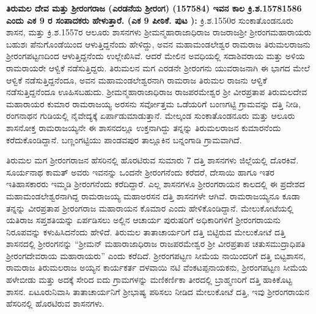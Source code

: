 \textbf{ತಿರುಮಲ ದೇವ ಮತ್ತು ಶ‍್ರೀರಂಗರಾಜ (ಎರಡನೆಯ ಶ‍್ರೀರಂಗ) (1575\general{\enginline{-}}84) ಇವನ ಕಾಲ ಕ್ರಿ.ಶ.1578\general{\enginline{-}}1586 ಎಂದು ಎಕ 9 ರ ಸಂಪಾದಕರು ಹೇಳುತ್ತಾರೆ. (ಎಕ 9 ಪೀಠಿಕೆ. ಪುಟ ): } ಕ್ರಿ.ಶ.1550ರ ಸುಂಕಾತೊಂಡನೂರು ಶಾಸನ, ಮತ್ತು ಕ್ರಿ.ಶ.1557ರ ಆಲೂರು ಶಾಸನಗಳು ಶ‍್ರೀಮನ್ಮಹಾರಾಜಾಧಿರಾಜ ರಾಜರಾಜಶ‍್ರೀ ಶ‍್ರೀರಂಗಮಹಾರಾಯರು ಬಹುಶಃ ಪೆನುಗೊಂಡೆಯಿಂದ ಆಳುತ್ತಿದ್ದನೆಂದು ಹೇಳಿದ್ದು, ಅವನ ಮಹಾಮಂಡಲೇಶ್ವರ ರಾಮರಾಜ ತಿರುಮಲರಾಜನು ಶ‍್ರೀರಂಗಪಟ್ಟಣದಿಂದ ಆಳುತ್ತಿದ್ದನೆಂದು ಉಲ್ಲೇಖಿಸಿವೆ. ಆದರೆ ಮೇಲಿನ ಅವಧಿಯಲ್ಲಿ ಸದಾಶಿವರಾಯ ಮತ್ತು ಅಳಿಯ ರಾಮರಾಯರೇ ಆಳ್ವಿಕೆ ನಡೆಸುತ್ತಿದ್ದರು. ತಿರುಮಲನ ಮಗ ಎರಡನೇ ಶ‍್ರೀರಂಗನು ಯುವರಾಜನಾಗಿ ಈ ಭಾಗದ ಮೇಲೆ ಆಳ್ವಿಕೆ ನಡೆಸುತ್ತಿದ್ದನೆಂದೂ, ಅವನ ಮಹಾಮಂಡಲೇಶ್ವರನಾಗಿ ರಾಮರಾಜ ತಿರುಮಲ ರಾಜನು ಆಳ್ವಿಕೆ ನಡೆಸುತ್ತಿದ್ದನೆಂದೂ ಊಹಿಸಬಹುದು. ಶ‍್ರೀಮನ್ಮಹಾರಾಜಾಧಿರಾಜ ರಾಜಪರಮೇಶ್ವರ ಶ‍್ರೀ ವೀರಪ್ರತಾಪ ತಿರುಮಲದೇವ ಮಹಾರಾಯರ ಕುಮಾರ ರಾಮರಾಜಯ್ಯ ಅರಸನು ಸರ್ವೋತ್ತಮ ಒಡೆಯರಿಗೆ ಬಂಣಗಟ್ಟಿ ಗ್ರಾಮವನ್ನು ದತ್ತಿ ನೀಡಿ, ರಂಗನಾಥನ ಗುಡಿಯಲ್ಲಿ ನೈವೇದ್ಯಕ್ಕೆ ಏರ್ಪಾಡು\-ಮಾಡುತ್ತಾನೆ. ಮೇಲ್ಕಂಡ ಸುಂಕಾತೊಂಡನೂರು ಮತ್ತು ಆಲೂರು ಶಾಸನೋಕ್ತ ರಾಮರಾಜಯ್ಯನೇ ಈ ಶಾಸನದಲ್ಲೂ ಉಕ್ತನಾಗಿದ್ದು ತನ್ನನ್ನು ತಿರುಮಲರಾಜನ ಕುಮಾರನೆಂದು ಕರೆದುಕೊಂಡಿದ್ದಾನೆ. ಬಣ್ಣಂಗಟ್ಟಿಯು ಪಾಂಡವಪುರ ತಾಲ್ಲೂಕಿನ ಬನ್ನಂಗಾಡಿ ಗ್ರಾಮವಾಗಿದೆ.

ತಿರುಮಲ ಮಗ ಶ‍್ರೀರಂಗರಾಜನ ಹೆಸರಿನಲ್ಲಿ ಹೊರಟಿರುವ ಸುಮಾರು 7 ದತ್ತಿ ಶಾಸನಗಳು ಜಿಲ್ಲೆಯಲ್ಲಿ ದೊರಕಿವೆ. ಸೂರ್ಯನಾಥ ಕಾಮತ್​ ಅವರು ಇವನನ್ನು ಒಂದನೇ ಶ‍್ರೀರಂಗನೆಂದು ಕರೆದರೆ, ದೇಸಾಯಿ ಹಾಗೂ ಇತರ ಇತಿಹಾಸಕಾರರು ಇಮ್ಮಡಿ ಶ‍್ರೀರಂಗನೆಂದು ಕರೆದಿದ್ದಾರೆ. ಎಲ್ಲ ಶಾಸನಗಳೂ ಶ‍್ರೀರಂಗರಾಯನ ಕಾಲದಲ್ಲಿ ಈ ಪ್ರದೇಶದ ಮಹಾಮಂಡಲೇಶ್ವರ\-ನಾಗಿದ್ದ ರಾಮರಾಜಯ್ಯ ಮಹಾಅರಸನ ದತ್ತಿ ಶಾಸನಗಳೇ ಆಗಿವೆ. ರಾಮರಾಜಯ್ಯನೂ ಕೂಡಾ ತನ್ನನ್ನು ವೀರಪ್ರತಾಪ ಶ‍್ರೀರಂಗರಾಜ ಮಹಾರಾಯನ ಕೊಮಾರ ಎಂದು ಹೇಳಿಕೊಂಡಿದ್ದಾನೆ. ಮೇಲುಕೋಟೆಯಲ್ಲಿ ಯತಿರಾಜ ಸಪ್ತಶತಿಯನ್ನು ಏರ್ಪಡಿಸಲು ಅಲ್ಲಿನ ಆಚಾರ್ಯ ಪುರುಷರಿಗೆ ಅಧಿಕಾರಿಗಳಿಗೆ ಶ‍್ರೀರಂಗರಾಯನು ನಿರೂಪವನ್ನು ಕಳುಹಿಸಿದನೆಂದು ಹೇಳಿದೆ. ತಿರುಮಲ ತಾತಾಚಾರ್ಯರಿಗೆ ದತ್ತಿ ಬಿಟ್ಟಿರುವ ಮೇಲುಕೋಟೆ ದತ್ತಿ ಶಾಸನದಲ್ಲಿ ಶ‍್ರೀರಂಗನನ್ನು “ಶ‍್ರೀಮನ್​ ಮಹಾರಾಜಾಧಿರಾಜ ರಾಜಪರಮೇಶ್ವರ ಶ‍್ರೀ ವೀರಪ್ರತಾಪ ಚತುಸಮುದ್ರಾಧಿಪತಿ ಶ‍್ರೀರಂಗದೇವರಾಯ ಮಹಾರಾಯರು” ಎಂದು ಕರೆದಿದೆ. ಶ‍್ರೀರಂಗಪಟ್ಟಣ ಸೀಮೆಯ ನಾಯಿಂದರಿಗೆ ದತ್ತಿ ಬಿಟ್ಟಶಾಸನ, ರಾಮರಾಜ ತಿರುಮಲರಾಜ ಅಯ್ಯನ ಕಾರ್ಯಕರ್ತ ದಳವಾಯಿ ನಟಿ ವೆಂಕಟಪ್ಪನಾಯಕನು, ಶ‍್ರೀರಂಗಪಟ್ಟಣ ಸೀಮೆಯ ಹಳೇಬೀಡು ಮತ್ತು ಅದಕ್ಕೆ ಸೇರಿದ ಐದು ಗ್ರಾಮಗಳನ್ನು ಮಣಿಕರ್ಣಿಕಾ ತೀರದಲ್ಲಿ ಬ್ರಾಹ್ಮಣರಿಗೆ ದತ್ತಿ ಹಾಕಿಕೊಟ್ಟ ಶಾಸನ. ಏಟೂರುನಿವಾಸಿ ತಾತಾಚಾರ್ಯನಿಗೆ ಶ‍್ರೀಭಾಷ್ಯ ಪಠಿಸಲು ನೀಡಿದ ಮೇಲುಕೋಟೆ ದತ್ತಿ, ಇವು ಶ‍್ರೀರಂಗರಾಯನ ಹೆಸರಿನಲ್ಲಿ ಹೊರಟಿರುವ ಶಾಸನಗಳು.

